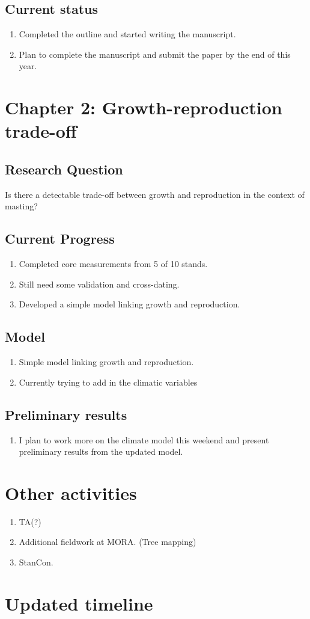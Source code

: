 \documentclass[11pt,letter]{article}
\begin{document}
\subsection{Current status}
\begin{enumerate}
\item Completed the outline and started writing the manuscript.
\item Plan to complete the manuscript and submit the paper by the end of this year.
\end{enumerate}

\section{Chapter 2: Growth-reproduction trade-off}
\subsection{Research Question}
Is there a detectable trade-off between growth and reproduction in the context of masting?
\subsection{Current Progress}
\begin{enumerate}
\item Completed core measurements from 5 of 10 stands.
\item Still need some validation and cross-dating.
\item Developed a simple model linking growth and reproduction.
\end{enumerate}
\subsection{Model}
\begin{enumerate}
\item Simple model linking growth and reproduction.
\item Currently trying to add in the climatic variables
\end{enumerate}
\subsection{Preliminary results}
\begin{enumerate}
\item I plan to work more on the climate model this weekend and present preliminary results from the updated model.
\end{enumerate}
\section{Other activities}
\begin{enumerate}
\item TA(?)
\item Additional fieldwork at MORA. (Tree mapping)
\item StanCon.
\end{enumerate}
\section{Updated timeline}
\end{document}
